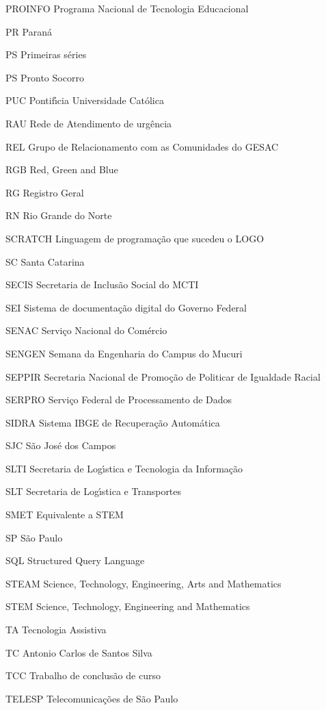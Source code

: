 \begin{siglas}
\item[PROINFO] Programa Nacional de Tecnologia Educacional
\item[PR] Paran\'a
\item[PS] Primeiras s\'eries
\item[PS] Pronto Socorro
\item[PUC] Pontif\'{\i}cia Universidade Cat\'olica
\item[RAU] Rede de Atendimento de urg\^encia
\item[REL] Grupo de Relacionamento com as Comunidades do GESAC
\item[RGB] Red, Green and Blue
\item[RG] Registro Geral
\item[RN] Rio Grande do Norte
\item[SCRATCH] Linguagem de programa\c{c}\~ao que sucedeu o LOGO
\item[SC] Santa Catarina
\item[SECIS] Secretaria de Inclus\~ao Social do MCTI
\item[SEI] Sistema de documenta\c{c}\~ao digital do Governo Federal
\item[SENAC] Servi\c{c}o Nacional do Com\'ercio
\item[SENGEN]  Semana da Engenharia do Campus do Mucuri
\item[SEPPIR] Secretaria Nacional de Promo\c{c}\~ao de Politicar de Igualdade Racial
\item[SERPRO] Servi\c{c}o Federal de Processamento de Dados
\item[SIDRA] Sistema IBGE de Recupera\c{c}\~ao Autom\'atica
\item[SJC] S\~ao Jos\'e dos Campos
\item[SLTI]  Secretaria de Log\'{\i}stica e Tecnologia da Informa\c{c}\~ao 
\item[SLT]  Secretaria de Log\'{\i}stica e Transportes
\item[SMET] Equivalente a STEM
\item[SP] S\~ao Paulo
\item[SQL] Structured Query Language
\item[STEAM] Science, Technology, Engineering, Arts and Mathematics
\item[STEM]  Science, Technology, Engineering and Mathematics
\item[TA] Tecnologia Assistiva
\item[TC] Antonio Carlos de Santos Silva
\item[TCC] Trabalho de conclus\~ao de curso
\item[TELESP] Telecomunica\c{c}\~oes de S\~ao Paulo

\end{siglas}
